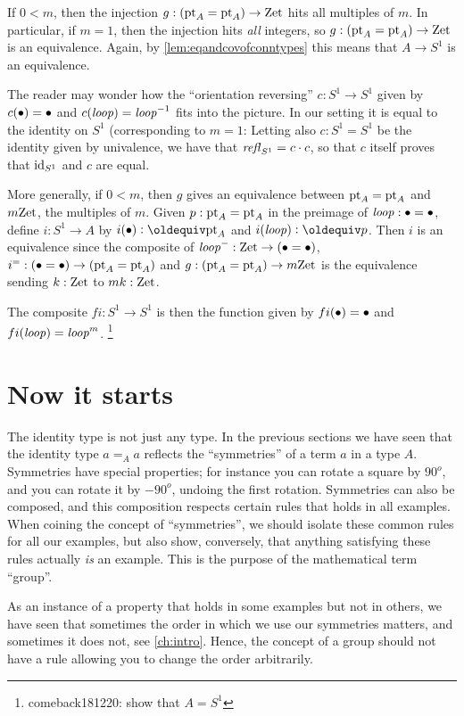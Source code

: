 If $0<m$, then the injection $g:({\mathord{\mathrm{pt}}}_A={\mathord{\mathrm{pt}}}_A)\to\mathrm{Zet}$ hits all multiples of $m$.  In particular, if $m=1$, then the injection hits \emph{all} integers, so $g:({\mathord{\mathrm{pt}}}_A={\mathord{\mathrm{pt}}}_A)\to\mathrm{Zet}$ is an equivalence.  Again, by \cref{lem:eqandcovofconntypes} this means that $A\to S^1$ is an equivalence. 
\begin{remark}
  The reader may wonder how the ``orientation reversing'' $c:S^1\to S^1$ given by $c(\bullet)=\bullet$ and $c(\mathit{loop})=\mathit{loop}^{-1}$ fits into the picture.  In our setting it is equal to the identity on $S^1$ (corresponding to $m=1$: Letting also $c:S^1=S^1$ be the identity given by univalence, we have that $\mathop{{\it refl}_{S^1}}=c\cdot c$, so that $c$ itself proves that $\mathord{\mathrm{id}}_{S^1}$ and $c$ are equal.
\end{remark}


More generally, if $0<m$, then $g$ gives an equivalence between ${\mathord{\mathrm{pt}}}_A={\mathord{\mathrm{pt}}}_A$ and $m\mathrm{Zet}$, the multiples of $m$.  Given $p:{\mathord{\mathrm{pt}}}_A={\mathord{\mathrm{pt}}}_A$ in the preimage of $\mathit{loop}:\bullet=\bullet$, define $i:S^1\to A$ by $i(\base)\defequi\pt_A$ and $i(\Sloop)\defequi p$.  Then $i$ is an equivalence since the composite of $\mathit{loop}^-:\mathrm{Zet}\to (\bullet=\bullet)$, $i^=:(\bullet=\bullet)\to ({\mathord{\mathrm{pt}}}_A={\mathord{\mathrm{pt}}}_A)$ and $g:({\mathord{\mathrm{pt}}}_A={\mathord{\mathrm{pt}}}_A)\to m\mathrm{Zet}$ is the equivalence sending $k:\mathrm{Zet}$ to $mk:\mathrm{Zet}$. 

The composite $fi:S^1\to S^1$ is then the function given by $fi(\bullet)=\bullet$ and $fi(\mathit{loop})=\mathit{loop}^m$.  \footnote{comeback181220: show that $A=S^1$}





\section{Now it starts}
The identity type is not just any type.  In the previous sections we have seen that the identity type $a=_Aa$ reflects the ``symmetries'' of a term $a$ in a type $A$.  Symmetries have special properties; for instance you can rotate a square by $90^o$, and you can rotate it by $-90^o$, undoing the first rotation.
Symmetries can also be composed, and this composition respects certain rules that holds in all examples.  When coining the concept of ``symmetries'', we should isolate these common rules for all our examples, but also show, conversely, that anything satisfying these rules actually \emph{is} an example.  This is the purpose of the mathematical term ``group''.

As an instance of a property that holds in some examples but not in others, we have seen that sometimes the order in which we use our symmetries matters, and sometimes it does not, see \cref{ch:intro}.  Hence, the concept of a group should not have a rule allowing you to change the order arbitrarily.

